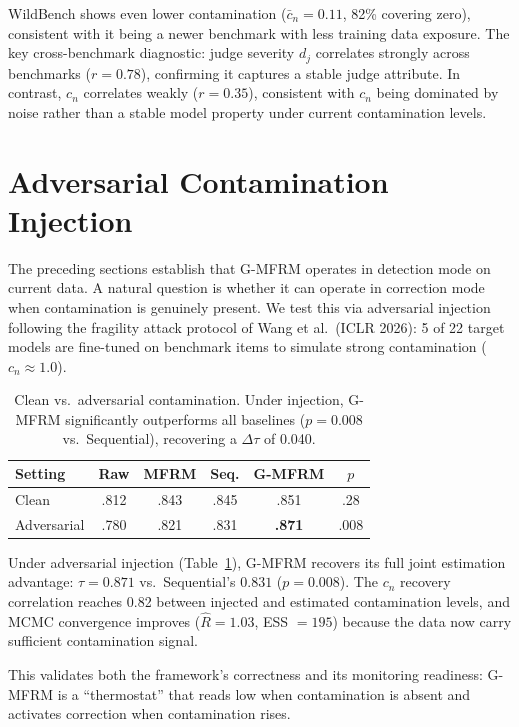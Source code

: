 \documentclass[11pt]{article}
\begin{document}
WildBench shows even lower contamination ($\bar{c}_n = 0.11$, 82\% covering zero), consistent with it being a newer benchmark with less training data exposure. The key cross-benchmark diagnostic: judge severity $d_j$ correlates strongly across benchmarks ($r = 0.78$), confirming it captures a stable judge attribute. In contrast, $c_n$ correlates weakly ($r = 0.35$), consistent with $c_n$ being dominated by noise rather than a stable model property under current contamination levels.

\section{Adversarial Contamination Injection}
\label{sec:adversarial}

The preceding sections establish that G-MFRM operates in detection mode on current data. A natural question is whether it can operate in correction mode when contamination is genuinely present. We test this via adversarial injection following the fragility attack protocol of Wang et al.\ (ICLR 2026): 5 of 22 target models are fine-tuned on benchmark items to simulate strong contamination ($c_n \approx 1.0$).

\begin{table}[t]
\centering
\small
\begin{tabular}{lccccc}
\toprule
Setting & Raw & MFRM & Seq. & G-MFRM & $p$ \\
\midrule
Clean & .812 & .843 & .845 & .851 & .28 \\
Adversarial & .780 & .821 & .831 & \textbf{.871} & .008 \\
\bottomrule
\end{tabular}
\caption{Clean vs.\ adversarial contamination. Under injection, G-MFRM significantly outperforms all baselines ($p = 0.008$ vs.\ Sequential), recovering a $\Delta\tau$ of 0.040.}
\label{tab:adversarial}
\end{table}

Under adversarial injection (Table~\ref{tab:adversarial}), G-MFRM recovers its full joint estimation advantage: $\tau = 0.871$ vs.\ Sequential's $0.831$ ($p = 0.008$). The $c_n$ recovery correlation reaches 0.82 between injected and estimated contamination levels, and MCMC convergence improves ($\hat{R} = 1.03$, ESS $= 195$) because the data now carry sufficient contamination signal.

This validates both the framework's correctness and its monitoring readiness: G-MFRM is a ``thermostat'' that reads low when contamination is absent and activates correction when contamination rises.
\end{document}
